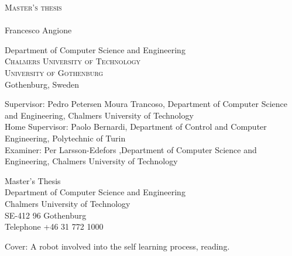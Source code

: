 \newpage
\thispagestyle{empty}
\begin{center}
	\textsc{\large Master's thesis \the\year}\\[4cm]		%
	\textbf{\Large \multiLineTitle{0.2cm}} \\[1cm]
	{\large Francesco Angione}
	
	\vfill	
	\begin{figure}[H]
	\centering
	\end{figure}	\vspace{5mm}	
	
	Department of Computer Science and Engineering\\
	\textsc{Chalmers University of Technology} \\
	\textsc{University of Gothenburg} \\
	Gothenburg, Sweden \the\year \\
\end{center}


\newpage
\thispagestyle{empty}
\vspace*{4.5cm}


Supervisor: Pedro Petersen Moura Trancoso, Department of Computer Science and Engineering, Chalmers University of Technology \\
Home Supervisor: Paolo Bernardi,  Department of Control and Computer Engineering, Polytechnic of Turin \\
Examiner: Per Larsson-Edefors ,Department of Computer Science and Engineering, Chalmers University of Technology  \setlength{\parskip}{1cm}

Master's Thesis \the\year\\	%
Department of Computer Science and Engineering\\
Chalmers University of Technology\\
SE-412 96 Gothenburg\\
Telephone +46 31 772 1000 \setlength{\parskip}{0.5cm}

\vfill
Cover: A robot involved into the self learning process, reading.



